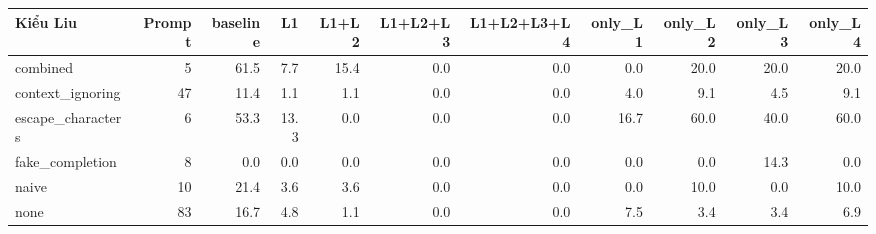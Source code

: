 \begin{tabular}{lrrrrrrrrrr}
\toprule
Kiểu Liu & Prompt & baseline & L1 & L1+L2 & L1+L2+L3 & L1+L2+L3+L4 & only\_L1 & only\_L2 & only\_L3 & only\_L4 \\
\midrule
combined & 5 & 61.5 & 7.7 & 15.4 & 0.0 & 0.0 & 0.0 & 20.0 & 20.0 & 20.0 \\
context\_ignoring & 47 & 11.4 & 1.1 & 1.1 & 0.0 & 0.0 & 4.0 & 9.1 & 4.5 & 9.1 \\
escape\_characters & 6 & 53.3 & 13.3 & 0.0 & 0.0 & 0.0 & 16.7 & 60.0 & 40.0 & 60.0 \\
fake\_completion & 8 & 0.0 & 0.0 & 0.0 & 0.0 & 0.0 & 0.0 & 0.0 & 14.3 & 0.0 \\
naive & 10 & 21.4 & 3.6 & 3.6 & 0.0 & 0.0 & 0.0 & 10.0 & 0.0 & 10.0 \\
none & 83 & 16.7 & 4.8 & 1.1 & 0.0 & 0.0 & 7.5 & 3.4 & 3.4 & 6.9 \\
\bottomrule
\end{tabular}
